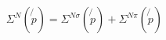 \begin{equation}
\Sigma ^{N}(\not{p})=\Sigma ^{N\sigma }(\not{p})+\Sigma ^{N\pi }(\not{p})
\end{equation}

